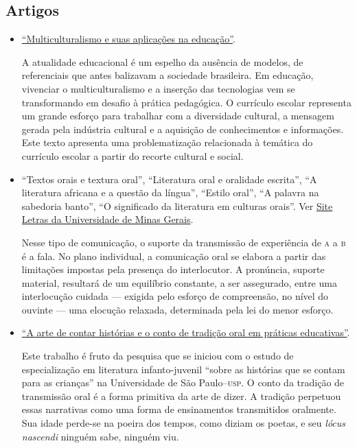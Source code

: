 \documentclass[11pt]{extarticle}
\begin{document}
\subsection{Artigos}

\begin{itemize}
\item \href{educacaopublica.cecierj.edu.br/artigos/19/1/multiculturalismo-e-suas-implicaes-na-educao}{``Multiculturalismo e suas aplicações na educação''}.

	A atualidade educacional é um espelho da ausência de modelos, de referenciais que antes balizavam a sociedade brasileira. Em educação, vivenciar o multiculturalismo e a inserção das tecnologias vem se transformando em desafio à prática pedagógica. O currículo escolar representa um grande esforço para trabalhar com a diversidade cultural, a mensagem gerada pela indústria cultural e a aquisição de conhecimentos e informações. Este texto apresenta uma problematização relacionada à temática do currículo escolar a partir do recorte cultural e social.

	\item ``Textos orais e textura oral'', ``Literatura oral e oralidade escrita'', ``A literatura africana e a questão da língua'', ``Estilo oral'', ``A palavra na sabedoria banto'', ``O significado da literatura em culturas orais''. Ver \href{letras.ufmg.br/padrao_cms/documentos/eventos/vivavoz/A\%20tradi\%C3\%A7\%C3\%A3o\%20oral_diagramado_16jun2016.pdf}{Site Letras da Universidade de Minas Gerais}. 

	Nesse tipo de comunicação, o suporte da transmissão de experiência
de \textsc{a} a \textsc{b} é a fala. No plano individual, a comunicação oral se elabora
a partir das limitações impostas pela presença do interlocutor. A pronúncia, suporte material, 
resultará de um equilíbrio constante, a ser assegurado, entre uma interlocução cuidada --- 
exigida pelo esforço de compreensão, no nível do ouvinte --- uma elocução relaxada,
determinada pela lei do menor esforço.

\item \href{pepsic.bvsalud.org/scielo.php?script=sci_arttext&pid=S1415-69542013000100004}{``A arte de contar histórias e o conto de tradição oral em práticas educativas''}. 

Este trabalho é fruto da pesquisa que se iniciou com o estudo de especialização em literatura infanto-juvenil ``sobre as histórias que se contam para as crianças'' na Universidade de São Paulo--\textsc{usp}. O conto da tradição de transmissão oral é a forma primitiva da arte de dizer. A tradição perpetuou essas narrativas como uma forma de ensinamentos transmitidos oralmente. Sua idade perde-se na poeira dos tempos, como diziam os poetas, e seu \textit{lócus nascendi} ninguém sabe, ninguém viu.

\end{itemize}
\end{document}
